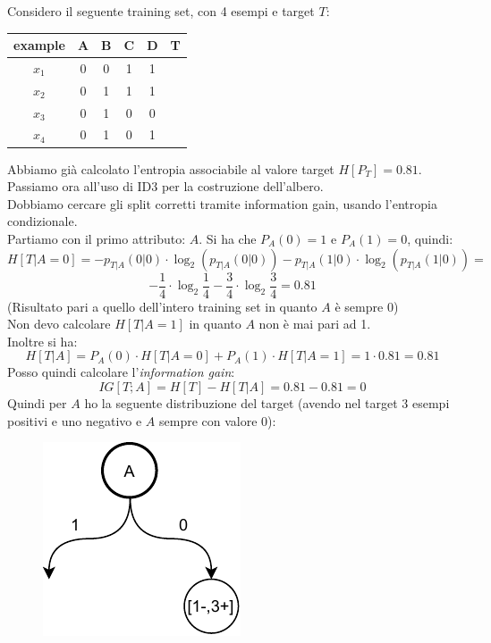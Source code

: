 \documentclass[a4paper,12pt, oneside]{book}
\begin{document}
\begin{esercizio}
  Considero il seguente training set, con 4 esempi e target $T$:
  \begin{table}[H]
    \centering
    \begin{tabular}{c|c|c|c|c|c}
      example & A & B & C & D & T\\
      \hline
      $x_1$ & 0 & 0 & 1 & 1 & \color{darkgreen}{1}\\
      $x_2$ & 0 & 1 & 1 & 1 & \color{darkgreen}{1}\\
      $x_3$ & 0 & 1 & 0 & 0 & \color{red}{0}\\
      $x_4$ & 0 & 1 & 0 & 1 & \color{darkgreen}{1}\\
    \end{tabular}
  \end{table}
  Abbiamo già calcolato l'entropia associabile al valore target $H[P_T]=0.81$.\\
  Passiamo ora all'uso di ID3 per la costruzione dell'albero.\\
  Dobbiamo cercare gli split corretti tramite information gain, usando
  l'entropia condizionale.\\
  Partiamo con il primo attributo: $A$. Si ha che $P_A(0)=1$ e $P_A(1)=0$,
  quindi:
  \[H[T|A=0]=-p_{T|A}(0|0)\cdot \log_2(p_{T|A}(0|0))-p_{T|A}(1|0)\cdot
    \log_2(p_{T|A}(1|0))=\]
  \[-\frac{1}{4}\cdot\log_2\frac{1}{4}-
    \frac{3}{4}\cdot\log_2\frac{3}{4}=0.81\]
  (Risultato pari a quello dell'intero training set in quanto $A$ è sempre 0)\\
  Non devo calcolare $H[T|A=1]$ in quanto $A$ non è mai pari ad 1.\\
  Inoltre si ha:
  \[H[T|A]=P_A(0)\cdot H[T|A=0]+P_A(1)\cdot H[T|A=1]=1\cdot 0.81=0.81\]
  Posso quindi calcolare l'\textit{information gain}:
  \[IG[T;A]=H[T]-H[T|A]=0.81-0.81=0\]
  \newpage
  Quindi per $A$ ho la seguente distribuzione del target (avendo nel target 3
  esempi positivi e uno negativo e $A$ sempre con valore 0):
  \begin{figure}[H]
    \centering
    \includegraphics[scale = 0.9]{img/id1.pdf}

\end{figure}
\end{esercizio}
\end{document}
